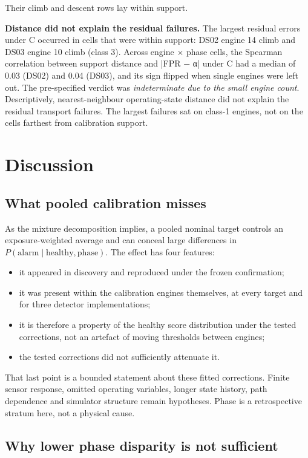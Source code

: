 \documentclass[preprint,11pt,a4paper]{elsarticle}
\begin{document}
Their climb and descent rows lay within support.

\textbf{Distance did not explain the residual failures.} The largest residual errors under C occurred in cells that were within support: DS02 engine 14 climb and DS03 engine 10 climb (class 3). Across engine × phase cells, the Spearman correlation between support distance and |FPR − α| under C had a median of 0.03 (DS02) and 0.04 (DS03), and its sign flipped when single engines were left out. The pre-specified verdict was \emph{indeterminate due to the small engine count}. Descriptively, nearest-neighbour operating-state distance did not explain the residual transport failures. The largest failures sat on class-1 engines, not on the cells farthest from calibration support.

\section{Discussion}

\subsection{What pooled calibration misses}

As the mixture decomposition implies, a pooled nominal target controls an exposure-weighted average and can conceal large differences in $P(\mathrm{alarm}\mid\mathrm{healthy},\mathrm{phase})$. The effect has four features:
\begin{itemize}
\item it appeared in discovery and reproduced under the frozen confirmation;
\item it was present within the calibration engines themselves, at every target and for three detector implementations;
\item it is therefore a property of the healthy score distribution under the tested corrections, not an artefact of moving thresholds between engines;
\item the tested corrections did not sufficiently attenuate it.
\end{itemize}

That last point is a bounded statement about these fitted corrections. Finite sensor response, omitted operating variables, longer state history, path dependence and simulator structure remain hypotheses. Phase is a retrospective stratum here, not a physical cause.

\subsection{Why lower phase disparity is not sufficient}
\end{document}
